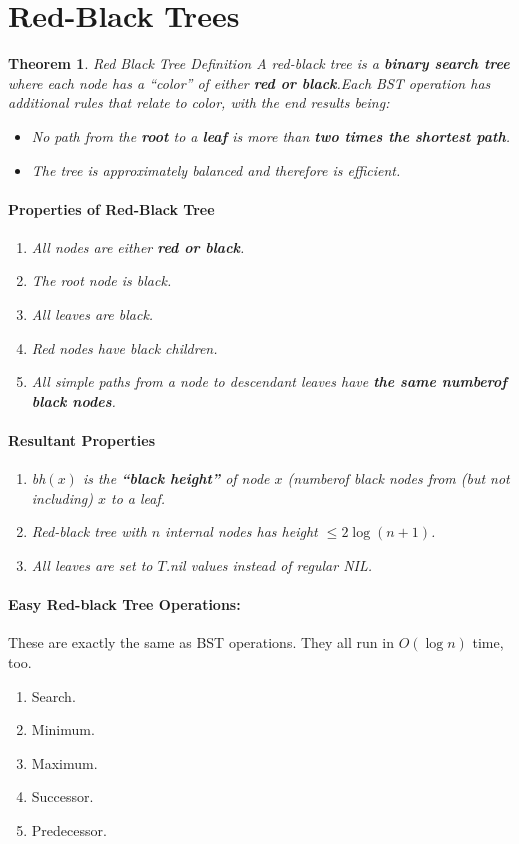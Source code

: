 \documentclass[a4paper,12pt]{report}
\newtheorem{theorem}{Theorem}
\begin{document}
\section{Red-Black Trees}

\begin{theorem}{Red Black Tree Definition}
A red-black tree is a \textbf{binary search tree} where each node has a ``color'' of either \textbf{red or black}.Each BST operation has additional rules that relate to color, with the end results being:
\begin{itemize}
\item No path from the \textbf{root} to a \textbf{leaf} is more than \textbf{two times the shortest path}.
\item The tree is approximately balanced and therefore is efficient.
\end{itemize}

\paragraph{Properties of Red-Black Tree} 
\begin{enumerate}
\item All nodes are either \textbf{red or black}.
\item The root node is black.
\item All leaves are black.
\item Red nodes have black children.
\item All simple paths from a node to descendant leaves have \textbf{the same numberof black nodes}.
\end{enumerate}

\paragraph{Resultant Properties} 
\begin{enumerate}
\item bh$(x)$ is the \textbf{``black height''} of node $x$ (numberof black nodes from (but not including) $x$ to a leaf.
\item Red-black tree with $n$ internal nodes has height $\leq 2\log(n+1)$.
\item All leaves are set to $T$.nil values instead of regular NIL.
\end{enumerate}
\end{theorem}

\paragraph{Easy Red-black Tree Operations: } These are exactly the same as BST operations. They all run in $O(\log n)$ time, too.
\begin{enumerate}
\item Search.
\item Minimum.
\item Maximum.
\item Successor.
\item Predecessor. 
\end{enumerate}
\end{document}
